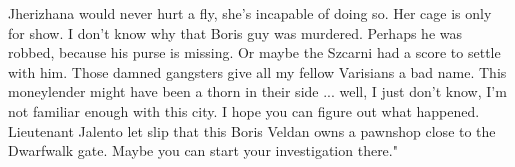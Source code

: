 Jherizhana would never hurt a fly, she's incapable of doing so. Her cage is only for show. I don't know why that Boris guy was murdered. Perhaps he was robbed, because his purse is missing. Or maybe the Szcarni had a score to settle with him. Those damned gangsters give all my fellow Varisians a bad name. This moneylender might have been a thorn in their side ... well, I just don't know, I'm not familiar enough with this city. I hope you can figure out what happened.\\

Lieutenant Jalento let slip that this Boris Veldan owns a pawnshop close to the Dwarfwalk gate. Maybe you can start your investigation there."\\

